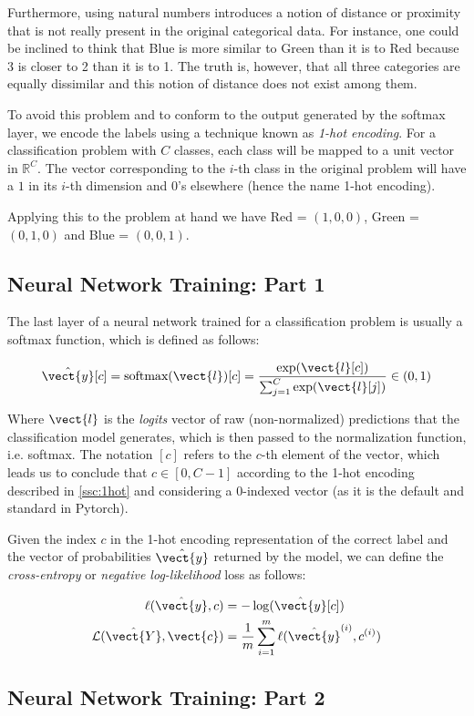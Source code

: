 Furthermore, using natural numbers introduces a notion of distance or proximity that is not really present in the original categorical data. For instance, one could be inclined to think that Blue is more similar to Green than it is to Red because 3 is closer to 2 than it is to 1. The truth is, however, that all three categories are equally dissimilar and this notion of distance does not exist among them.

To avoid this problem and to conform to the output generated by the softmax layer, we encode the labels using a technique known as \emph{1-hot encoding}. For a classification problem with $C$ classes, each class will be mapped to a unit vector in $\mathbb{R}^C$. The vector corresponding to the $i$-th class in the original problem will have a $1$ in its $i$-th dimension and $0$'s elsewhere (hence the name 1-hot encoding).

Applying this to the problem at hand we have Red = $(1,0,0)$, Green = $(0,1,0)$ and Blue = $(0,0,1)$.

\subsection{Neural Network Training: Part 1}
The last layer of a neural network trained for a classification problem is usually a softmax function, which is defined as follows:

\begin{equation*}
    \hat{\vect{y}}[c] = \text{softmax}(\vect{l})[c] = \frac{\exp(\vect{l}[c])}{\sum_{j=1}^C \exp(\vect{l}[j])} \in (0,1)
\end{equation*}

Where $\vect{l}$ is the \emph{logits} vector of raw (non-normalized) predictions that the classification model generates, which is then passed to the normalization function, i.e. softmax. The notation $[c]$ refers to the $c$-th element of the vector, which leads us to conclude that $c \in [0,C-1]$ according to the 1-hot encoding described in \ref{ssc:1hot} and considering a 0-indexed vector (as it is the default and standard in Pytorch).

Given the index $c$ in the 1-hot encoding representation of the correct label and the vector of probabilities $\hat{\vect{y}}$ returned by the model, we can define the \emph{cross-entropy} or \emph{negative log-likelihood} loss as follows:

\begin{align*}
    \ell(\hat{\vect{y}},c) &= -\log(\hat{\vect{y}}[c]) \\
    \mathcal{L}(\hat{\vect{Y}},\vect{c}) &= \frac{1}{m}\sum_{i=1}^m \ell(\hat{\vect{y}}^{(i)},c^{(i)})
\end{align*}

\subsection{Neural Network Training: Part 2}
